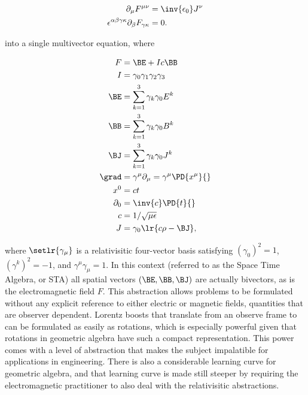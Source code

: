 \begin{dmath}\label{eqn:syllabusAndContext:n}
\begin{aligned}
\partial_\mu F^{\mu\nu} &= \inv{\epsilon_0} J^\nu \\
\epsilon^{\alpha\beta\gamma\kappa} \partial_\beta F_{\gamma\kappa} &= 0.
\end{aligned}
\end{dmath}

into a single multivector equation, where

\begin{dmath}\label{eqn:syllabusAndContext:n}
\begin{aligned}
F &= \BE + I c \BB \\
I &= \gamma_0 \gamma_1 \gamma_2 \gamma_3 \\
\BE &= \sum_{k = 1}^3 \gamma_k \gamma_0 E^k \\
\BB &= \sum_{k = 1}^3 \gamma_k \gamma_0 B^k \\
\BJ &= \sum_{k = 1}^3 \gamma_k \gamma_0 J^k \\
\grad &= \gamma^\mu \partial_\mu = \gamma^\mu \PD{x^\mu}{} \\
x^0 &= c t \\
\partial_0 &= \inv{c} \PD{t}{} \\
c &= 1/\sqrt{\mu\epsilon} \\
J &= \gamma_0 \lr{ c \rho - \BJ },
\end{aligned}
\end{dmath}

where \( \setlr{ \gamma_\mu } \) is a relativisitic four-vector basis satisfying \( (\gamma_0)^2 = 1 \), \( (\gamma^k)^2 = -1 \), and \( \gamma^\mu \gamma_\mu = 1 \).  In this context (referred to as the Space Time Algebra, or STA) all spatial vectors \((\BE, \BB, \BJ)\) are actually bivectors, as is the electromagnetic field \( F \).  This abstraction allows problems to be formulated 
without any explicit reference to either electric or magnetic fields, quantities that are observer dependent.  Lorentz boosts that translate from an observe frame to can be formulated as easily as rotations, which is especially powerful given that rotations in geometric algebra have such a compact representation.
This power comes with a level of abstraction that makes the subject impalatible for applications in engineering.
There is also a considerable learning curve for geometric algebra, and that learning curve is made still steeper by requiring the electromagnetic practitioner to also deal with the relativisitic abstractions.

